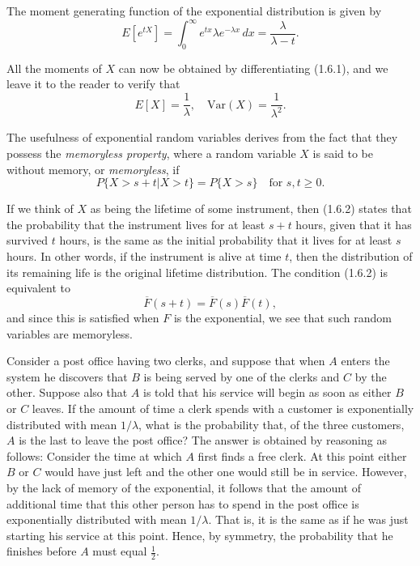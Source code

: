 \documentclass[lang=cn,10pt,thmcnt=section]{elegantbook}
\begin{document}
The moment generating function of the exponential distribution is given by
\begin{equation}
E[e^{tX}] = \int_{0}^{\infty} e^{tx} \lambda e^{-\lambda x} \, dx = \frac{\lambda}{\lambda - t}. \tag{1.6.1}
\end{equation}

All the moments of $X$ can now be obtained by differentiating (1.6.1), and we leave it to the reader to verify that
\[
E[X] = \frac{1}{\lambda}, \quad \text{Var}(X) = \frac{1}{\lambda^2}.
\]

The usefulness of exponential random variables derives from the fact that they possess the \textit{memoryless property}, where a random variable $X$ is said to be without memory, or \textit{memoryless}, if
\begin{equation}
P\{X > s + t | X > t\} = P\{X > s\} \quad \text{for } s, t \geq 0. \tag{1.6.2}
\end{equation}

If we think of $X$ as being the lifetime of some instrument, then (1.6.2) states that the probability that the instrument lives for at least $s + t$ hours, given that it has survived $t$ hours, is the same as the initial probability that it lives for at least $s$ hours. In other words, if the instrument is alive at time $t$, then the distribution of its remaining life is the original lifetime distribution. The condition (1.6.2) is equivalent to
\[
\overline{F}(s + t) = \overline{F}(s) \overline{F}(t),
\]
and since this is satisfied when $F$ is the exponential, we see that such random variables are memoryless.
\begin{example}
	Consider a post office having two clerks, and suppose that when $A$ enters the system he discovers that $B$ is being served by one of the clerks and $C$ by the other. Suppose also that $A$ is told that his service will begin as soon as either $B$ or $C$ leaves. If the amount of time a clerk spends with a customer is exponentially distributed with mean $1/\lambda$, what is the probability that, of the three customers, $A$ is the last to leave the post office?
The answer is obtained by reasoning as follows: Consider the time at which $A$ first finds a free clerk. At this point either $B$ or $C$ would have just left and the other one would still be in service. However, by the lack of memory of the exponential, it follows that the amount of additional time that this other person has to spend in the post office is exponentially distributed with mean $1/\lambda$. That is, it is the same as if he was just starting his service at this point. Hence, by symmetry, the probability that he finishes before $A$ must equal $\frac{1}{2}$.
\end{example}
\end{document}
